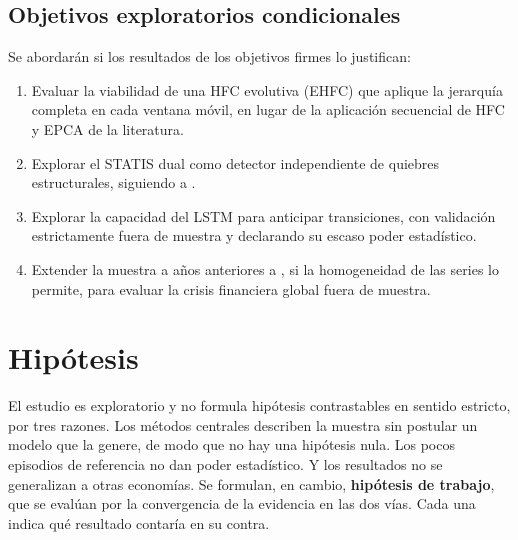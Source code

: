 \subsection{Objetivos exploratorios condicionales}

Se abordarán si los resultados de los objetivos firmes lo justifican:

\begin{enumerate}[label=\textbf{OC\arabic*.}, ref=OC\arabic*, leftmargin=*]
  \item\label{oc:ehfc} Evaluar la viabilidad de una HFC evolutiva (EHFC) que aplique la
    jerarquía completa en cada ventana móvil, en lugar de la aplicación secuencial de HFC y EPCA
    de la literatura.
  \item\label{oc:statis} Explorar el STATIS dual como detector independiente de quiebres
    estructurales, siguiendo a
    \textcite{camiz_maulucci_roig_2010}.
  \item\label{oc:anticipar} Explorar la capacidad del LSTM para anticipar transiciones, con
    validación estrictamente fuera de muestra y declarando su escaso poder estadístico.
  \item\label{oc:extension} Extender la muestra a años anteriores a \anioInicioDatos{}, si la
    homogeneidad de las series lo permite, para evaluar la crisis financiera global fuera de
    muestra.
\end{enumerate}

\section{Hipótesis}
\label{sec:hipotesis}

El estudio es exploratorio y no formula hipótesis contrastables en sentido estricto, por tres
razones. Los métodos centrales describen la muestra sin postular un modelo que la genere, de
modo que no hay una hipótesis nula. Los pocos episodios de referencia no dan poder estadístico.
Y los resultados no se generalizan a otras economías. Se formulan, en cambio, \textbf{hipótesis
de trabajo}, que se evalúan por la convergencia de la evidencia en las dos vías. Cada una indica
qué resultado contaría en su contra.

